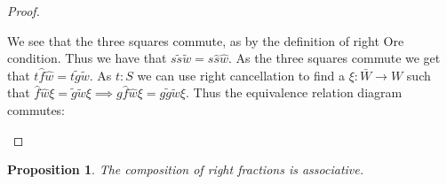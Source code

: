 \documentclass[11pt]{article}
\newtheorem{prop}[theorem]{Proposition}
\theoremstyle{definition}
\theoremstyle{remark}
\begin{document}
\begin{proof}
\begin{center}
                \end{center}
                We see that the three squares commute, as by the definition of right Ore condition. Thus we have that $s\widetilde{s}\widetilde{w} = s\widehat{s}\widehat{w}$. As the three squares commute we get that $t\widehat{f}\widehat{w}=t\widetilde{g}\widetilde{w}$. As $t:S$ we can use right cancellation to find a $\xi:\bar{W}\rightarrow W$ such that $\widehat{f}\widehat{w}\xi = \widetilde{g}\widetilde{w}\xi \implies g\widehat{f}\widehat{w}\xi = g\widetilde{g}\widetilde{w}\xi$. Thus the equivalence relation diagram commutes:
                \begin{center}
                \end{center}
            \end{proof}

            \begin{prop}
                The composition of right fractions is associative.
            \end{prop}
\end{document}
